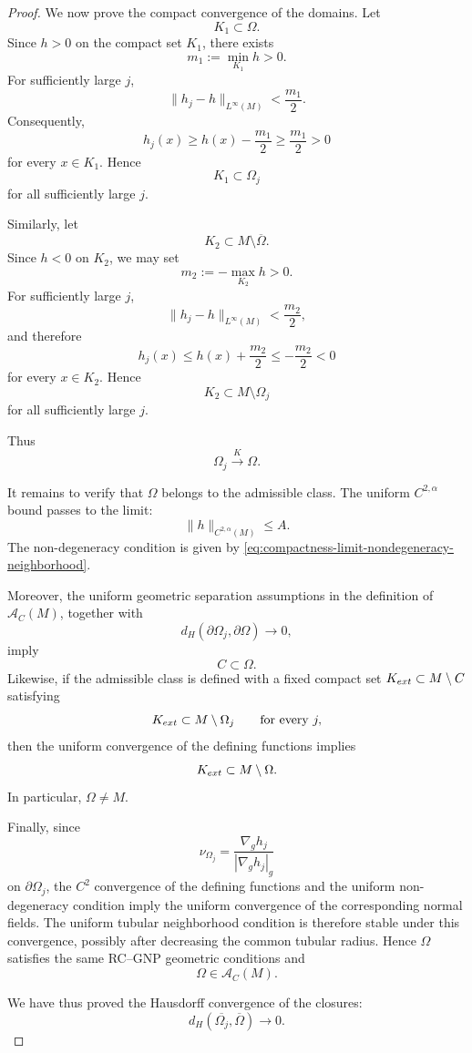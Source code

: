 \documentclass[10pt,a4paper]{amsart}
\begin{document}
\begin{proof}
We now prove the compact convergence of the domains. Let
\[
K_1\subset\Omega.
\]
Since $h>0$ on the compact set $K_1$, there exists
\[
m_1:=\min_{K_1}h>0.
\]
For sufficiently large $j$,
\[
\|h_j-h\|_{L^\infty(M)}<\frac{m_1}{2}.
\]
Consequently,
\[
h_j(x)
\ge h(x)-\frac{m_1}{2}
\ge\frac{m_1}{2}>0
\]
for every $x\in K_1$. Hence
\[
K_1\subset\Omega_j
\]
for all sufficiently large $j$.

Similarly, let
\[
K_2\subset M\setminus\overline{\Omega}.
\]
Since $h<0$ on $K_2$, we may set
\[
m_2:=-\max_{K_2}h>0.
\]
For sufficiently large $j$,
\[
\|h_j-h\|_{L^\infty(M)}<\frac{m_2}{2},
\]
and therefore
\[
h_j(x)
\le h(x)+\frac{m_2}{2}
\le-\frac{m_2}{2}<0
\]
for every $x\in K_2$. Hence
\[
K_2\subset M\setminus\Omega_j
\]
for all sufficiently large $j$.

Thus
\begin{equation}
\Omega_j\overset{K}{\longrightarrow}\Omega.
\label{eq:compactness-K-final}
\end{equation}

It remains to verify that $\Omega$ belongs to the admissible class.
The uniform $C^{2,\alpha}$ bound passes to the limit:
\[
\|h\|_{C^{2,\alpha}(M)}\le A.
\]
The non-degeneracy condition is given by
\eqref{eq:compactness-limit-nondegeneracy-neighborhood}.

Moreover, the uniform geometric separation assumptions in the
definition of $\mathcal A_C(M)$, together with
\[
d_H(\partial\Omega_j,\partial\Omega)\to0,
\]
imply
\[
C\subset\Omega.
\]
Likewise, if the admissible class is defined with a fixed compact set
$K_{\rm ext}\subset M\setminus C$ satisfying
\[
K_{\rm ext}\subset M\setminus\Omega_j
\qquad\text{for every }j,
\]
then the uniform convergence of the defining functions implies
\[
K_{\rm ext}\subset M\setminus\Omega.
\]
In particular, $\Omega\neq M$.

Finally, since
\[
\nu_{\Omega_j}
=
\frac{\nabla_g h_j}
{|\nabla_g h_j|_g}
\]
on $\partial\Omega_j$, the $C^2$ convergence of the defining
functions and the uniform non-degeneracy condition imply the uniform
convergence of the corresponding normal fields. The uniform tubular
neighborhood condition is therefore stable under this convergence,
possibly after decreasing the common tubular radius. Hence $\Omega$
satisfies the same RC--GNP geometric conditions and
\[
\Omega\in\mathcal A_C(M).
\]

We have thus proved the Hausdorff convergence of the closures:
\[
d_H(\overline{\Omega_j},\overline{\Omega})
\longrightarrow0.
\]


\end{proof}
\end{document}
